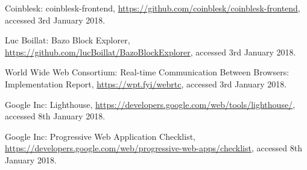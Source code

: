 \begin{thebibliography}{99}
 Coinblesk: coinblesk-frontend, \url{https://github.com/coinblesk/coinblesk-frontend}, accessed 3rd January 2018.

 Luc Boillat: Bazo Block Explorer, \url{https://github.com/lucBoillat/BazoBlockExplorer}, accessed 3rd January 2018.

 World Wide Web Consortium: Real-time Communication Between Browsers: Implementation Report, \url{https://wpt.fyi/webrtc}, accessed 3rd January 2018.

 Google Inc: Lighthouse, \url{https://developers.google.com/web/tools/lighthouse/}, accessed 8th January 2018.

 Google Inc: Progressive Web Application Checklist, \url{https://developers.google.com/web/progressive-web-apps/checklist}, accessed 8th January 2018.


\end{thebibliography}


